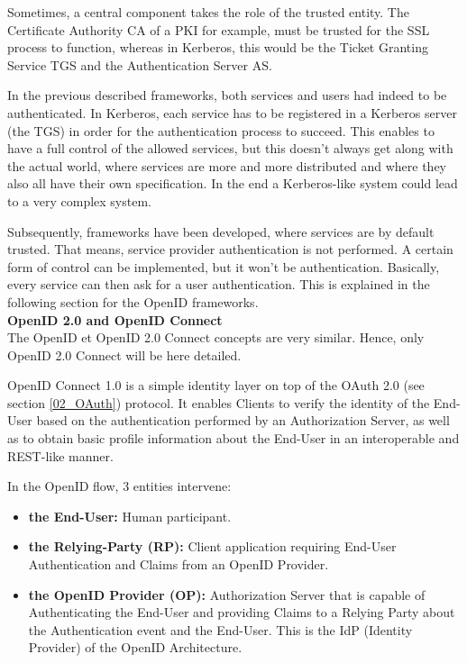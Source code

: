 Sometimes, a central component takes the role of the trusted entity. The Certificate Authority CA of a PKI for example, must be trusted for the SSL process to function, whereas in Kerberos, this would be the Ticket Granting Service TGS and the Authentication Server AS.

In the previous described frameworks, both services and users had indeed to be authenticated. In Kerberos, each service has to be registered in a Kerberos server (the TGS) in order for the authentication process to succeed. This enables to have a full control of the allowed services, but this doesn't always get along with the actual world, where services are more and more distributed and where they also all have their own specification. In the end a Kerberos-like system could lead to a very complex system. 

Subsequently, frameworks have been developed, where services are by default trusted. That means, service provider authentication is not performed. A certain form of control can be implemented, but it won't be authentication. Basically, every service can then ask for a user authentication. This is explained in the following section for the OpenID frameworks. \\
 
\quad \tabitem \textbf{OpenID 2.0 and OpenID Connect}\\
\label{02_OpenID}
The OpenID et OpenID 2.0 Connect concepts are very similar. Hence, only OpenID 2.0 Connect will be here detailed.

OpenID Connect 1.0 is a simple identity layer on top of the OAuth 2.0 (see section \ref{02_OAuth}) protocol. It enables Clients to verify the identity of the End-User based on the authentication performed by an Authorization Server, as well as to obtain basic profile information about the End-User in an interoperable and REST-like manner\cite{sakimura2014openid}.

In the OpenID flow, 3 entities intervene: 
\begin{itemize}
	\item \textbf{the End-User:} Human participant.
	\item \textbf{the Relying-Party (RP):} Client application requiring End-User Authentication and Claims from an OpenID Provider.
	\item \textbf{the OpenID Provider (OP):} Authorization Server that is capable of Authenticating the End-User and providing Claims to a Relying Party about the Authentication event and the End-User. This is the IdP (Identity Provider) of the OpenID Architecture.
\end{itemize}


